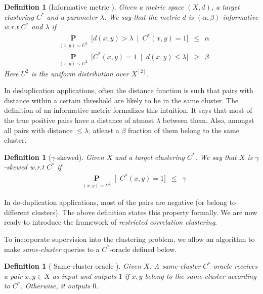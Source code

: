 \documentclass[12pt]{article}
\newtheorem{definition}[theorem]{Definition}
\newcommand{\mb}{\mathbf}
\begin{document}
\begin{definition}[Informative metric \cite{kushagra2018semisupervised}]
Given a metric space $(X, d)$, a target clustering $C^*$ and a parameter $\lambda$. We say that the metric $d$ is $(\alpha, \beta)$-informative w.r.t $C^*$ and $\lambda$ if
\begin{align}
	&\underset{(x, y) \sim U^2}{\mb P}\enspace \big[d(x, y) > \lambda \enspace|\enspace C^*(x, y) = 1\big] \enspace \le \enspace \alpha \label{eqn:alphaInformative}\\
	&\underset{(x, y) \sim U^2}{\mb P}\enspace \big[C^*(x, y) = 1 \enspace|\enspace d(x, y) \le \lambda \big] \enspace \ge \enspace \beta \label{eqn:betaInformative}
\end{align}
Here $U^2$ is the uniform distribution over $X^{[2]}$. 
\end{definition} 
In deduplication applications, often the distance function is such that pairs with distance within a certain threshold are likely to be in the same cluster. The definition of an informative metric formalizes this intuition. It says that most of the true positive pairs have a distance of atmost $\lambda$ between them. Also, amongst all pairs with distance $\le \lambda$, atleast a $\beta$ fraction of them belong to the same cluster. 

\begin{definition}[$\gamma$-skewed] 
\label{defn:gammaskewed} 
Given $X$ and a target clustering $C^*$. We say that $X$ is $\gamma$-skewed w.r.t $C^*$ if 
\begin{align*}
	&\underset{(x, y) \sim U^2}{\mb P}\enspace \big[\enspace C^*(x, y) = 1 \big] \enspace \le \enspace \gamma
\end{align*}
\end{definition}
In de-duplication applications, most of the pairs are negative (or belong to different clusters). The above definition states this property formally. We are now ready to introduce the framework of \textit{restricted correlation clustering}. 

To incorporate supervision into the clustering problem, we allow an algorithm to make \textit{same-cluster} queries to a $C^*$-oracle defined below.
\begin{definition}[ Same-cluster oracle \cite{ashtiani2016clustering}]
Given $X$. A same-cluster $C^*$-oracle receives a pair $x, y \in X$ as input and outputs $1$ if $x, y$ belong to the same-cluster according to $C^*$. Otherwise, it outputs $0$. 
\end{definition}
\end{document}
